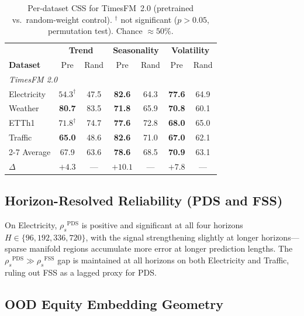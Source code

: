 \documentclass[10pt]{article}
\theoremstyle{definition}
\theoremstyle{remark}
\newcommand{\pds}{\ensuremath{\mathrm{PDS}}}
\newcommand{\fss}{\ensuremath{\mathrm{FSS}}}
\newcommand{\rspear}{\ensuremath{\rho_s}}
\begin{document}
\begin{table}[h]
\centering
\caption{Per-dataset CSS for TimesFM~2.0 (pretrained vs.\ random-weight control).
$^\dagger$ not significant ($p{>}0.05$, permutation test).
Chance $\approx 50\%$.}
\label{tab:probing_detail}
\small
\setlength{\tabcolsep}{4pt}
\begin{tabular}{lcc|cc|cc}
\toprule
& \multicolumn{2}{c|}{\textbf{Trend}}
& \multicolumn{2}{c|}{\textbf{Seasonality}}
& \multicolumn{2}{c}{\textbf{Volatility}}\\
\textbf{Dataset} & Pre & Rand & Pre & Rand & Pre & Rand\\
\midrule
\multicolumn{7}{l}{\textit{TimesFM 2.0}}\\
Electricity & $54.3^\dagger$ & 47.5 & \textbf{82.6} & 64.3 & \textbf{77.6} & 64.9\\
Weather     & \textbf{80.7}  & 83.5 & \textbf{71.8} & 65.9 & \textbf{70.8} & 60.1\\
ETTh1       & $71.8^\dagger$ & 74.7 & \textbf{77.6} & 72.8 & \textbf{68.0} & 65.0\\
Traffic     & \textbf{65.0}  & 48.6 & \textbf{82.6} & 71.0 & \textbf{67.0} & 62.1\\
\cmidrule{2-7}
Average     & 67.9           & 63.6 & \textbf{78.6} & 68.5 & \textbf{70.9} & 63.1\\
$\Delta$    & $+4.3$         & ---  & $\mathbf{+10.1}$ & --- & $\mathbf{+7.8}$ & ---\\
\bottomrule
\end{tabular}
\end{table}

\subsection{Horizon-Resolved Reliability (PDS and FSS)}
\label{app:horizon_pds}

On Electricity, $\rspear^{\pds}$ is positive and significant at all four
horizons $H\in\{96,192,336,720\}$, with the signal strengthening slightly at
longer horizons---sparse manifold regions accumulate more error at longer
prediction lengths.
The $\rspear^{\pds} \gg \rspear^{\fss}$ gap is maintained at all horizons on
both Electricity and Traffic, ruling out FSS as a lagged proxy for PDS.

\subsection{OOD Equity Embedding Geometry}
\label{app:stock_ood}
\end{document}
